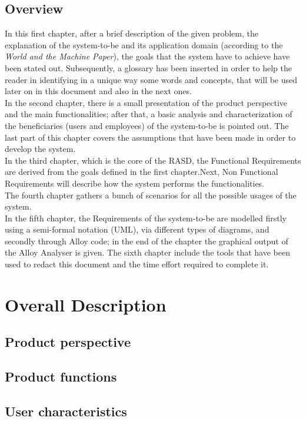 \documentclass[11pt,a4paper]{report}
\begin{document}
\section{Overview}
In this first chapter, after a brief description of the given problem, the explanation of the system-to-be and its application domain (according to the \textit{World and the Machine Paper}), the goals that the system have to achieve have been stated out.
Subsequently, a glossary has been inserted in order to help the reader in identifying in a unique way some words and concepts, that will be used later on in this document and also in the next ones.\\
In the second chapter, there is a small presentation of the product perspective and the main functionalities; after that, a basic analysis and characterization of the beneficiaries (users and employees) of the system-to-be is pointed out. The last part of this chapter covers the assumptions that have been made in order to develop the system.\\
In the third chapter, which is the core of the RASD, the Functional Requirements are derived from the goals defined in the first chapter.Next, Non Functional Requirements will describe how the system performs the functionalities.\\
The fourth chapter gathers a bunch of scenarios for all the possible usages of the system.\\
In the fifth chapter, the Requirements of the system-to-be are modelled firstly using a semi-formal notation (UML), via different types of diagrams, and secondly through Alloy code; in the end of the chapter the graphical output of the Alloy Analyser is given.
The sixth chapter include the tools that have been used to redact this document and the time effort required to complete it.
\chapter{Overall Description}
\section{Product perspective}
\section{Product functions}
\section{User characteristics}
\end{document}
